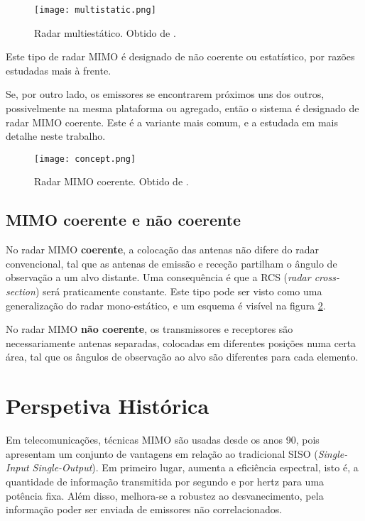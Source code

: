 \documentclass[purist,portuguese]{ist-report}
\begin{document}
\begin{figure}[h]
  \centering
  \texttt{[image: multistatic.png]}
  \caption{Radar multiestático. Obtido de \cite{mimoradarbook}.}
  \label{fig:multi}
\end{figure}

Este tipo de radar MIMO é designado de não coerente ou estatístico, por razões estudadas mais à frente.

Se, por outro lado, os emissores se encontrarem próximos uns dos outros, possivelmente na mesma plataforma ou agregado, então o sistema é designado de radar MIMO coerente.
Este é a variante mais comum, e a estudada em mais detalhe neste trabalho.

\begin{figure}[h]
  \centering
  \texttt{[image: concept.png]}
  \caption{Radar MIMO coerente. Obtido de \cite{mimoradarbook}.}
  \label{fig:concept}
\end{figure}

\subsection{MIMO coerente e não coerente}

No radar MIMO \textbf{coerente}, a colocação das antenas não difere do radar convencional, tal que as antenas de emissão e receção partilham o ângulo de observação a um alvo distante.
Uma consequência é que a RCS (\textit{radar cross-section}) será praticamente constante.
Este tipo pode ser visto como uma generalização do radar mono-estático, e um esquema é visível na figura \ref{fig:concept}.

No radar MIMO \textbf{não coerente}, os transmissores e receptores são necessariamente antenas separadas, colocadas em diferentes posições numa certa área, tal que os ângulos de observação ao alvo são diferentes para cada elemento.

\section{Perspetiva Histórica}

Em telecomunicações, técnicas MIMO são usadas desde os anos 90, pois apresentam um conjunto de vantagens em relação ao tradicional SISO (\textit{Single-Input Single-Output}).
Em primeiro lugar, aumenta a eficiência espectral, isto é, a quantidade de informação transmitida por segundo e por hertz para uma potência fixa. 
Além disso, melhora-se a robustez ao desvanecimento, pela informação poder ser enviada de emissores não correlacionados.
\end{document}
